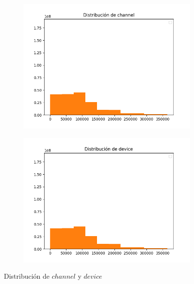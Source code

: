 \begin{figure}[H]
	\centering
	\begin{subfigure}{.5\textwidth}
		\centering
		\includegraphics[scale=0.5]{img/channel_distribution.png}
	\end{subfigure}%
	\begin{subfigure}{.5\textwidth}
		\centering
		\includegraphics[scale=0.5]{img/device_distribution.png}
	\end{subfigure}
	\caption{Distribución de $channel$ y $device$}
\end{figure}

